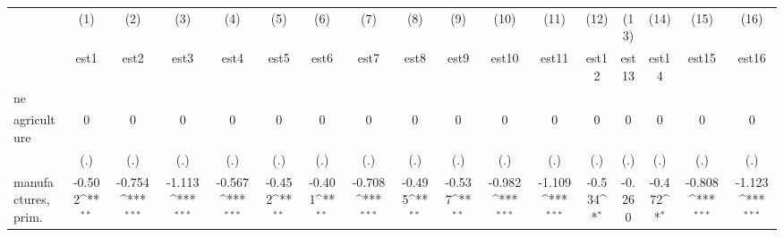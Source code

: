 {
\def\sym#1{\ifmmode^{#1}\else\(^{#1}\)\fi}
\begin{tabular}{l*{16}{c}}
\hline\hline
                    &\multicolumn{1}{c}{(1)}&\multicolumn{1}{c}{(2)}&\multicolumn{1}{c}{(3)}&\multicolumn{1}{c}{(4)}&\multicolumn{1}{c}{(5)}&\multicolumn{1}{c}{(6)}&\multicolumn{1}{c}{(7)}&\multicolumn{1}{c}{(8)}&\multicolumn{1}{c}{(9)}&\multicolumn{1}{c}{(10)}&\multicolumn{1}{c}{(11)}&\multicolumn{1}{c}{(12)}&\multicolumn{1}{c}{(13)}&\multicolumn{1}{c}{(14)}&\multicolumn{1}{c}{(15)}&\multicolumn{1}{c}{(16)}\\
                    &\multicolumn{1}{c}{est1}&\multicolumn{1}{c}{est2}&\multicolumn{1}{c}{est3}&\multicolumn{1}{c}{est4}&\multicolumn{1}{c}{est5}&\multicolumn{1}{c}{est6}&\multicolumn{1}{c}{est7}&\multicolumn{1}{c}{est8}&\multicolumn{1}{c}{est9}&\multicolumn{1}{c}{est10}&\multicolumn{1}{c}{est11}&\multicolumn{1}{c}{est12}&\multicolumn{1}{c}{est13}&\multicolumn{1}{c}{est14}&\multicolumn{1}{c}{est15}&\multicolumn{1}{c}{est16}\\
\hline
ne                  &                     &                     &                     &                     &                     &                     &                     &                     &                     &                     &                     &                     &                     &                     &                     &                     \\
agriculture         &           0         &           0         &           0         &           0         &           0         &           0         &           0         &           0         &           0         &           0         &           0         &           0         &           0         &           0         &           0         &           0         \\
                    &         (.)         &         (.)         &         (.)         &         (.)         &         (.)         &         (.)         &         (.)         &         (.)         &         (.)         &         (.)         &         (.)         &         (.)         &         (.)         &         (.)         &         (.)         &         (.)         \\
[1em]
manufactures, prim. &      -0.502\sym{**} &      -0.754\sym{***}&      -1.113\sym{***}&      -0.567\sym{***}&      -0.452\sym{**} &      -0.401\sym{**} &      -0.708\sym{***}&      -0.495\sym{**} &      -0.537\sym{**} &      -0.982\sym{***}&      -1.109\sym{***}&      -0.534\sym{*}  &      -0.260         &      -0.472\sym{*}  &      -0.808\sym{***}&      -1.123\sym{***}\\

\end{tabular}}
